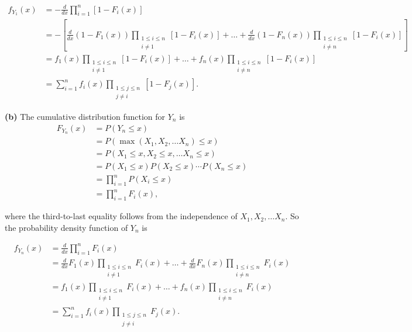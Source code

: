 \documentclass{article}
\begin{document}
\begin{align}
f_{Y_1}(x) &= -\frac{d}{dx}\prod\limits_{i=1}^n[1-F_i(x)] \\
&= -\left[\frac{d}{dx}(1-F_1(x))\prod\limits_{\substack{1\leq i \leq n \\ i\neq 1}}[1-F_i(x)] + \ldots +\frac{d}{dx}(1-F_n(x))\prod\limits_{\substack{1\leq i \leq n \\ i\neq n}}[1-F_i(x)]\right] \\
&=f_1(x)\prod\limits_{\substack{1\leq i \leq n \\ i\neq 1}}[1-F_i(x)] + \ldots +f_n(x)\prod\limits_{\substack{1\leq i \leq n \\ i\neq n}}[1-F_i(x)] \\
&= \sum\limits_{i=1}^nf_i(x)\prod\limits_{\substack{1\leq j \leq n \\ j\neq i}}[1-F_j(x)].
\end{align}

\vspace{3mm}

\noindent\textbf{(b)}  The cumulative distribution function for $Y_n$ is
\begin{align}
F_{Y_n}(x) &= P(Y_n \leq x) \\
&= P(\max(X_1,X_2,\ldots X_n) \leq x) \\
&= P(X_1 \leq x, X_2 \leq x, \ldots X_n \leq x) \\
&= P(X_1 \leq x)P(X_2 \leq x)\cdots P(X_n \leq x) \\
&= \prod\limits_{i=1}^nP(X_i \leq x) \\
&= \prod\limits_{i=1}^nF_i(x),
\end{align}

\noindent where the third-to-last equality follows from the independence of $X_1, X_2, \ldots X_n$.  So the probability density function of $Y_n$ is 

\begin{align}
f_{Y_n}(x) &= \frac{d}{dx}\prod\limits_{i=1}^nF_i(x) \\
&= \frac{d}{dx}F_1(x)\prod\limits_{\substack{1\leq i \leq n \\ i\neq 1}}F_i(x) + \ldots +\frac{d}{dx}F_n(x)\prod\limits_{\substack{1\leq i \leq n \\ i\neq n}}F_i(x)\\
&=f_1(x)\prod\limits_{\substack{1\leq i \leq n \\ i\neq 1}}F_i(x) + \ldots +f_n(x)\prod\limits_{\substack{1\leq i \leq n \\ i\neq n}}F_i(x) \\
&= \sum\limits_{i=1}^nf_i(x)\prod\limits_{\substack{1\leq j \leq n \\ j\neq i}}F_j(x).
\end{align}
\end{document}
